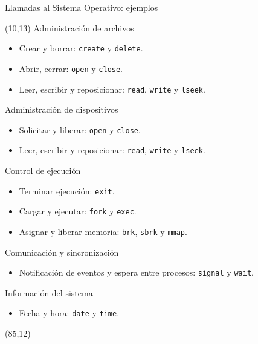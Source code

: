 \documentclass[aspectratio=169]{beamer}
\begin{document}
\begin{frame}[fragile]{Llamadas al Sistema Operativo: ejemplos}
    \begin{textblock}{75}(10,13)
    \textcolor{verdeuca}{Administración de archivos}
    \begin{itemize} \setlength\itemsep{0cm}
    \item \footnotesize Crear y borrar: \texttt{create} y \texttt{delete}.
    \item \footnotesize Abrir, cerrar: \texttt{open} y \texttt{close}.
    \item \footnotesize Leer, escribir y reposicionar: \texttt{read}, \texttt{write} y \texttt{lseek}.
    \end{itemize}
    \textcolor{verdeuca}{Administración de dispositivos}
    \begin{itemize} \setlength\itemsep{0cm}
    \item \footnotesize Solicitar y liberar: \texttt{open} y \texttt{close}.
    \item \footnotesize Leer, escribir y reposicionar: \texttt{read}, \texttt{write} y \texttt{lseek}.
    \end{itemize}
    \textcolor{verdeuca}{Control de ejecución}
    \begin{itemize} \setlength\itemsep{0cm}
    \item \footnotesize Terminar ejecución: \texttt{exit}.
    \item \footnotesize Cargar y ejecutar: \texttt{fork} y \texttt{exec}.
    \item \footnotesize Asignar y liberar memoria: \texttt{brk}, \texttt{sbrk} y \texttt{mmap}.
    \end{itemize}
    \textcolor{verdeuca}{Comunicación y sincronización}
    \begin{itemize} \setlength\itemsep{0cm}
    \item \footnotesize Notificación de eventos y espera entre procesos: \texttt{signal} y \texttt{wait}.
    \end{itemize}
    \textcolor{verdeuca}{Información del sistema}
    \begin{itemize} \setlength\itemsep{0cm}
    \item \footnotesize Fecha y hora: \texttt{date} y \texttt{time}.
    \end{itemize}
    \end{textblock}
    \begin{textblock}{65}(85,12)
    \begin{tcolorbox}[size=small,width=\textwidth,sharp corners,title={\footnotesize Ejemplo}]

\end{tcolorbox}
\end{textblock}
\end{frame}
\end{document}
